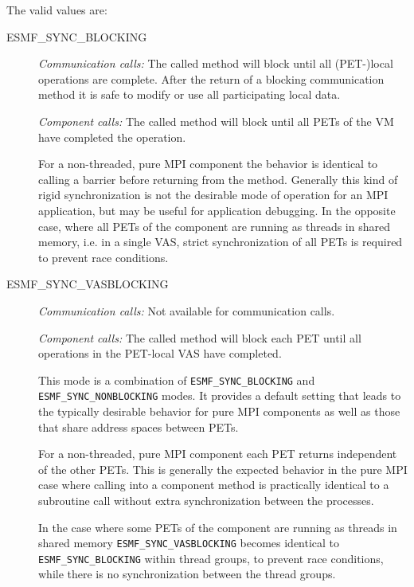 The valid values are:
\begin{description}

\item [ESMF\_SYNC\_BLOCKING]
         {\em Communication calls:} The called method will block until all
         (PET-)local operations are complete. After the return of a blocking
         communication method it is safe to modify or use all participating
         local data.
         
         {\em Component calls:} The called method will block until all PETs of
         the VM have completed the operation.
         
         For a non-threaded, pure MPI
         component the behavior is identical to calling a barrier before 
         returning from the method. Generally this kind of rigid 
         synchronization is not the desirable mode of operation for an MPI
         application, but may be useful for application debugging.
         In the opposite case, where all PETs of the component are running as
         threads in shared memory, i.e. in a single VAS, strict synchronization
         of all PETs is required to prevent race conditions.

\item [ESMF\_SYNC\_VASBLOCKING]
         {\em Communication calls:} Not available for communication calls.
         
         {\em Component calls:} The called method will block each PET until
         all operations in the PET-local VAS have completed. 
         
         This mode is a combination of {\tt ESMF\_SYNC\_BLOCKING} and
         {\tt ESMF\_SYNC\_NONBLOCKING} modes. It provides a default setting 
         that leads to the typically desirable behavior for pure MPI 
         components as well as those that share address spaces between PETs.
         
         For a non-threaded, pure MPI component each PET returns
         independent of the other PETs. This is generally the expected 
         behavior in the pure MPI case where calling into a component method is
         practically identical to a subroutine call without extra 
         synchronization between the processes.
         
\begin{sloppypar}
         In the case where some PETs of the component are running as
         threads in shared memory {\tt ESMF\_SYNC\_VASBLOCKING} becomes identical
         to {\tt ESMF\_SYNC\_BLOCKING} within thread groups, to prevent race
         conditions, while there is no synchronization between the thread
         groups.
\end{sloppypar}
         

\end{description}

